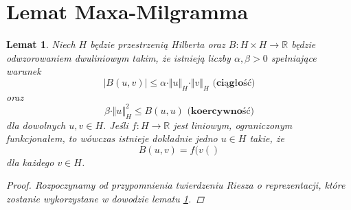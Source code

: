 \documentclass[12pt,a4paper,oneside,titlepage]{article}
\newtheorem{Lemat}{Lemat}
\begin{document}
\section{Lemat Maxa-Milgramma}
\begin{Lemat}  \label{l1}
Niech $H$ będzie przestrzenią Hilberta oraz $B: H \times H \rightarrow \mathbb{R}$ będzie odwzorowaniem dwuliniowym takim, że istnieją liczby $\alpha, \beta>0 $ spełniające warunek
\begin{equation} \label{N1}
\vert B(u,v) \vert \leq \alpha \cdot \Vert u \Vert_{H} \cdot \Vert v \Vert_H \textbf{   (ciągłość)}
\end{equation}
oraz
\begin{equation}
\beta \cdot \Vert u \Vert_H^2 \leq B(u,u) \textbf{  (koercywność)}
\end{equation}
dla dowolnych $u,v \in H$. Jeśli $f:H \rightarrow \mathbb{R}$ jest liniowym, ograniczonym funkcjonałem, to wówczas istnieje dokładnie jedno $u \in H$ takie, że
\begin{equation}
\nonumber
B(u,v) = f(v()
\end{equation}
dla każdego $v \in H$.
\begin{proof}
Rozpoczynamy od przypomnienia twierdzeniu Riesza o reprezentacji, które zostanie wykorzystane w dowodzie lematu \ref{l1}. 


\end{proof}
\end{Lemat}
\end{document}

